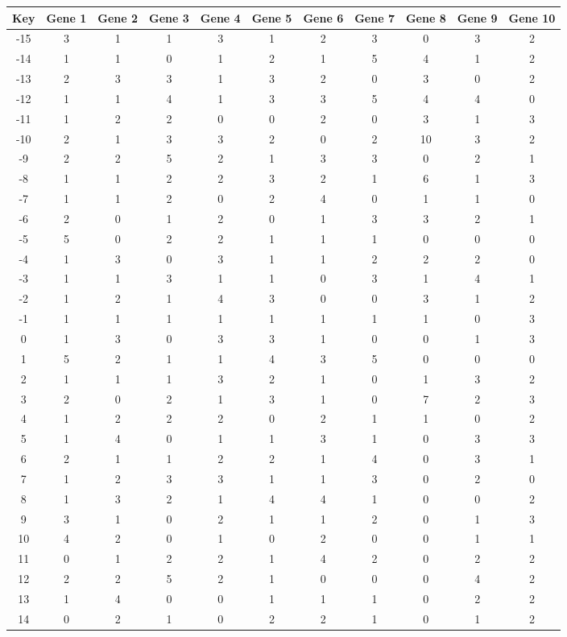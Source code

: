 \begin{tabular}{|c|c|c|c|c|c|c|c|c|c|c|}
\hline
Key & Gene 1 & Gene 2 & Gene 3 & Gene 4 & Gene 5 & Gene 6 & Gene 7 & Gene 8 & Gene 9 & Gene 10 \\
\hline
-15 & 3 & 1 & 1 & 3 & 1 & 2 & 3 & 0 & 3 & 2 \\
-14 & 1 & 1 & 0 & 1 & 2 & 1 & 5 & 4 & 1 & 2 \\
-13 & 2 & 3 & 3 & 1 & 3 & 2 & 0 & 3 & 0 & 2 \\
-12 & 1 & 1 & 4 & 1 & 3 & 3 & 5 & 4 & 4 & 0 \\
-11 & 1 & 2 & 2 & 0 & 0 & 2 & 0 & 3 & 1 & 3 \\
-10 & 2 & 1 & 3 & 3 & 2 & 0 & 2 & 10 & 3 & 2 \\
-9 & 2 & 2 & 5 & 2 & 1 & 3 & 3 & 0 & 2 & 1 \\
-8 & 1 & 1 & 2 & 2 & 3 & 2 & 1 & 6 & 1 & 3 \\
-7 & 1 & 1 & 2 & 0 & 2 & 4 & 0 & 1 & 1 & 0 \\
-6 & 2 & 0 & 1 & 2 & 0 & 1 & 3 & 3 & 2 & 1 \\
-5 & 5 & 0 & 2 & 2 & 1 & 1 & 1 & 0 & 0 & 0 \\
-4 & 1 & 3 & 0 & 3 & 1 & 1 & 2 & 2 & 2 & 0 \\
-3 & 1 & 1 & 3 & 1 & 1 & 0 & 3 & 1 & 4 & 1 \\
-2 & 1 & 2 & 1 & 4 & 3 & 0 & 0 & 3 & 1 & 2 \\
-1 & 1 & 1 & 1 & 1 & 1 & 1 & 1 & 1 & 0 & 3 \\
0 & 1 & 3 & 0 & 3 & 3 & 1 & 0 & 0 & 1 & 3 \\
1 & 5 & 2 & 1 & 1 & 4 & 3 & 5 & 0 & 0 & 0 \\
2 & 1 & 1 & 1 & 3 & 2 & 1 & 0 & 1 & 3 & 2 \\
3 & 2 & 0 & 2 & 1 & 3 & 1 & 0 & 7 & 2 & 3 \\
4 & 1 & 2 & 2 & 2 & 0 & 2 & 1 & 1 & 0 & 2 \\
5 & 1 & 4 & 0 & 1 & 1 & 3 & 1 & 0 & 3 & 3 \\
6 & 2 & 1 & 1 & 2 & 2 & 1 & 4 & 0 & 3 & 1 \\
7 & 1 & 2 & 3 & 3 & 1 & 1 & 3 & 0 & 2 & 0 \\
8 & 1 & 3 & 2 & 1 & 4 & 4 & 1 & 0 & 0 & 2 \\
9 & 3 & 1 & 0 & 2 & 1 & 1 & 2 & 0 & 1 & 3 \\
10 & 4 & 2 & 0 & 1 & 0 & 2 & 0 & 0 & 1 & 1 \\
11 & 0 & 1 & 2 & 2 & 1 & 4 & 2 & 0 & 2 & 2 \\
12 & 2 & 2 & 5 & 2 & 1 & 0 & 0 & 0 & 4 & 2 \\
13 & 1 & 4 & 0 & 0 & 1 & 1 & 1 & 0 & 2 & 2 \\
14 & 0 & 2 & 1 & 0 & 2 & 2 & 1 & 0 & 1 & 2 \\
\hline
\end{tabular}